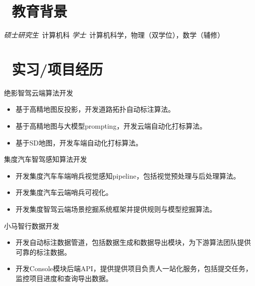 \documentclass{resume}
\begin{document}


 
\section{\faGraduationCap\  教育背景}
\textit{硕士研究生}\ 计算机科
\textit{学士}\ 计算机科学，物理（双学位），数学（辅修）

\section{\faUsers\ 实习/项目经历}
\role{高级算法工程师}{工作经历}
绝影智驾云端算法开发
\begin{itemize}
  \item 基于高精地图反投影，开发道路拓扑自动标注算法。
  \item 基于高精地图与大模型prompting，开发云端自动化打标算法。
  \item 基于SD地图，开发车端自动化打标算法。
\end{itemize}

集度汽车智驾感知算法开发
\begin{itemize}
  \item 开发集度汽车车端哨兵视觉感知pipeline，包括视觉预处理与后处理算法。
  \item 开发集度汽车云端哨兵可视化。
  \item 开发集度智驾云端场景挖掘系统框架并提供规则与模型挖掘算法。
\end{itemize}

小马智行数据开发
\begin{itemize}
  \item 开发自动标注数据管道，包括数据生成和数据导出模块，为下游算法团队提供可靠的标注数据。
  \item 开发Console模块后端API，提供提供项目负责人一站化服务，包括提交任务，监控项目进度和查询导出数据。
\end{itemize}
\end{document}
